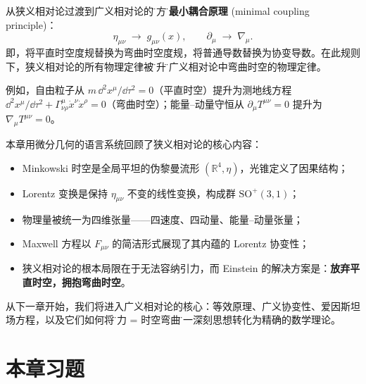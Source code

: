 \begin{theorem}[最小耦合原理 —— 预览]
从狭义相对论过渡到广义相对论的\"处方\"是\textbf{最小耦合原理} (minimal coupling principle)：
\begin{equation}\label{eq:minimal_coupling}
    \boxed{\eta_{\mu\nu} \;\longrightarrow\; g_{\mu\nu}(x), \qquad \partial_\mu \;\longrightarrow\; \nabla_\mu}.
\end{equation}
即，将平直时空度规替换为弯曲时空度规，将普通导数替换为协变导数。在此规则下，狭义相对论的所有物理定律被\"提升\"为广义相对论中弯曲时空的物理定律。

例如，自由粒子从 $m\,\dd^2 x^\mu / \dd\tau^2 = 0$（平直时空）提升为测地线方程 $\dd^2 x^\mu/\dd\tau^2 + \Gamma^\mu_{\nu\rho} \dot x^\nu \dot x^\rho = 0$（弯曲时空）；能量--动量守恒从 $\partial_\mu T^{\mu\nu} = 0$ 提升为 $\nabla_\mu T^{\mu\nu} = 0$。
\end{theorem}

\begin{note}[本章总结与展望]
本章用微分几何的语言系统回顾了狭义相对论的核心内容：
\begin{itemize}
    \item Minkowski 时空是全局平坦的伪黎曼流形 $(\mathbb{R}^4, \eta)$，光锥定义了因果结构；
    \item Lorentz 变换是保持 $\eta_{\mu\nu}$ 不变的线性变换，构成群 $\mathrm{SO}^+(3,1)$；
    \item 物理量被统一为四维张量——四速度、四动量、能量--动量张量；
    \item Maxwell 方程以 $F_{\mu\nu}$ 的简洁形式展现了其内蕴的 Lorentz 协变性；
    \item 狭义相对论的根本局限在于无法容纳引力，而 Einstein 的解决方案是：\textbf{放弃平直时空，拥抱弯曲时空}。
\end{itemize}

从下一章开始，我们将进入广义相对论的核心：等效原理、广义协变性、爱因斯坦场方程，以及它们如何将\"引力 = 时空弯曲\"这一深刻思想转化为精确的数学理论。
\end{note}


\section*{本章习题}

